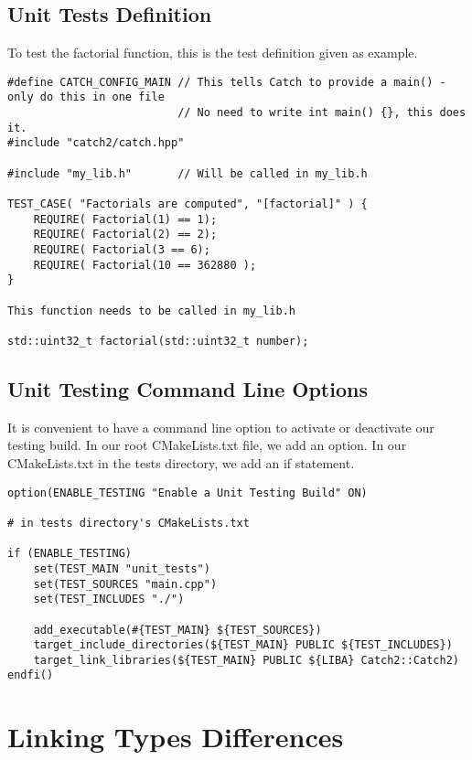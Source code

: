 \subsection{Unit Tests Definition}

To test the factorial function, this is the test definition given as example.

\begin{verbatim}
#define CATCH_CONFIG_MAIN // This tells Catch to provide a main() - only do this in one file
                          // No need to write int main() {}, this does it. 
#include "catch2/catch.hpp"

#include "my_lib.h"       // Will be called in my_lib.h

TEST_CASE( "Factorials are computed", "[factorial]" ) {
    REQUIRE( Factorial(1) == 1);
    REQUIRE( Factorial(2) == 2);
    REQUIRE( Factorial(3 == 6);
    REQUIRE( Factorial(10 == 362880 );
}

This function needs to be called in my_lib.h

std::uint32_t factorial(std::uint32_t number);
\end{verbatim}


\subsection{Unit Testing Command Line Options}

It is convenient to have a command line option to activate or deactivate our testing build. In our root CMakeLists.txt
file, we add an option. In our CMakeLists.txt in the tests directory, we add an if statement. 

\begin{verbatim}
option(ENABLE_TESTING "Enable a Unit Testing Build" ON) 

# in tests directory's CMakeLists.txt

if (ENABLE_TESTING)
    set(TEST_MAIN "unit_tests")
    set(TEST_SOURCES "main.cpp")
    set(TEST_INCLUDES "./")

    add_executable(#{TEST_MAIN} ${TEST_SOURCES})
    target_include_directories(${TEST_MAIN} PUBLIC ${TEST_INCLUDES})
    target_link_libraries(${TEST_MAIN} PUBLIC ${LIBA} Catch2::Catch2)
endfi()
\end{verbatim}

\section{Linking Types Differences} 

